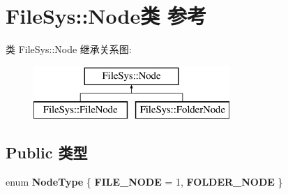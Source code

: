 \hypertarget{class_file_sys_1_1_node}{\section{File\-Sys\-:\-:Node类 参考}
\label{class_file_sys_1_1_node}
}
类 File\-Sys\-:\-:Node 继承关系图\-:\begin{figure}[H]
\begin{center}
\leavevmode
\includegraphics[height=2.000000cm]{class_file_sys_1_1_node}
\end{center}
\end{figure}
\subsection*{Public 类型}
\begin{DoxyCompactItemize}
\item 
enum {\bfseries Node\-Type} \{ {\bfseries F\-I\-L\-E\-\_\-\-N\-O\-D\-E} = 1, 
{\bfseries F\-O\-L\-D\-E\-R\-\_\-\-N\-O\-D\-E}
 \}
\end{DoxyCompactItemize}
